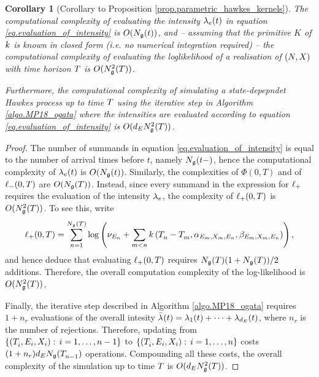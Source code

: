 \documentclass[10pt]{article}
\newtheorem{corol}[thm]{Corollary}
{\theoremstyle{definition}{
	\newtheorem{remark}[thm]{Remark} 
	\newtheorem{example}[thm]{Example} 
	\newtheorem{exercise}[thm]{Exercise}
	\newtheorem{assumption}[thm]{Assumption}
}}}
\begin{document}
\begin{corol}[Corollary to Proposition \ref{prop.parametric_hawkes_kernels}]
\label{corol.complexities}
The computational complexity of evaluating the intensity $\intensity(t)$ in equation \eqref{eq.evaluation_of_intensity} is $O(\groundProc(t))$, and -- assuming that the primitive $K$ of $\parametricHawkesKernel$ is known in closed form (i.e. no numerical integration required) -- the computational complexity of evaluating the loglikelihood of a realisation of $(\multiCountingProc, \stateVariable)$ with time horizon $\timeHorizon$ is $O(\groundProc\squared(\timeHorizon))$. 

Furthermore, the computational complexity of simulating a state-depepndet Hawkes process up to time $\timeHorizon$ using the iterative step in Algorithm \ref{algo.MP18_ogata} where the intensities are evaluated according to equation \eqref{eq.evaluation_of_intensity} is $O(\numEventTypes\groundProc\squared(\timeHorizon))$.
\end{corol}
\begin{proof}
The number of summands in equation \eqref{eq.evaluation_of_intensity} is equal to the number of arrival times before $t$, namely $\groundProc(t-)$, hence the computational complexity of $\intensity(t)$ is $O(\groundProc(t))$. Similarly, the complexities of $\Phi(0,T)$ and of $\lminus(0,T)$ are $O(\groundProc(T))$. Instead, since every summand in the expression for $\lplus$ requires the evaluation of the intensity $\intensity$, the complexity of $\lplus(0,T)$ is $O(\groundProc\squared(T))$. To see this, write 
\begin{equation*}
 \lplus(0,T) = \sum_{n=1}^{\groundProc(T)}
 \log \left(
 \baseRate_{\event} + \sum_{m < n}\parametricHawkesKernel\left(\arrivalTimes[]_n - \arrivalTimes[]_m, \impCoef_{\event[m],\stateVariable_m,\event[n]}, \decCoef_{\event[m],\stateVariable_m,\event[n]}\right)
 \right),
\end{equation*}
and hence deduce that evaluating $\lplus(0,T)$ requires $\groundProc(T)(1+\groundProc(T))/2$ additions. 
Therefore, the overall computation complexity of the log-likelihood is $O(\groundProc\squared(T))$.

Finally, the iterative step described in Algorithm \ref{algo.MP18_ogata} requires $1+n_r$ evaluations of the overall intesity $\bar{\intensity[]}(t) = \intensity[1](t)+\dots+\intensity[\numEventTypes](t)$, where $n_r$ is the number of rejections. Therefore, updating from $\lbrace(\arrivalTimes[]_i,\event[i],\stateVariable_i): \, i=1,\dots,n-1\rbrace$ to $\lbrace(\arrivalTimes[]_i,\event[i],\stateVariable_i): \, i=1,\dots,n\rbrace$ costs $(1+n_r)\numEventTypes\groundProc(\arrivalTimes[]_{n-1})$ operations. Compounding all these costs, the overall complexity of the simulation up to time $\timeHorizon$ is $O(\numEventTypes\groundProc\squared(\timeHorizon))$. 
\end{proof}
\end{document}
